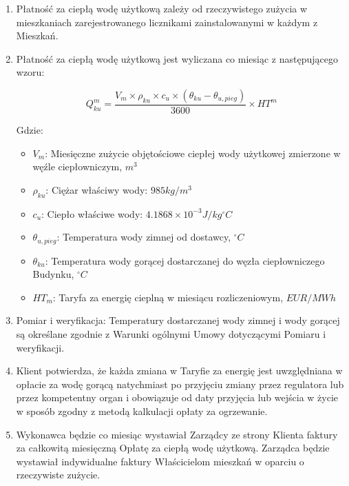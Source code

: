 \begin{enumerate}
	\item Płatność za ciepłą wodę użytkową zależy od rzeczywistego zużycia w mieszkaniach zarejestrowanego licznikami zainstalowanymi w każdym z Mieszkań.
	\item Płatność za ciepłą wodę użytkową jest wyliczana co miesiąc z następującego wzoru:

\[ Q^{m}_{ku} = \frac{V_m \times \rho_{ku} \times c_u \times \left(\theta_{ku} - \theta_{u,pieg}\right)}{3600} \times HT^m \]

Gdzie:

\begin{itemize}
	\item $V_m$: Miesięczne zużycie objętościowe ciepłej wody użytkowej zmierzone w węźle ciepłowniczym, $m^3$
	\item $\rho_{ku}$: Ciężar właściwy wody: $985 kg/m^3$
	\item $c_u$: Ciepło właściwe wody: $4.1868 \times 10^{-3} J/kg^\circ C$
	\item $\theta_{u,pieg}$: Temperatura wody zimnej od dostawcy, $^\circ C$
	\item $\theta_{ku}$: Temperatura wody gorącej dostarczanej do węzła ciepłowniczego Budynku, $^\circ C$
	\item $HT_m$: Taryfa za energię cieplną w miesiącu rozliczeniowym, $EUR/MWh$
\end{itemize}

	\item Pomiar i weryfikacja: Temperatury dostarczanej wody zimnej i wody gorącej są określane zgodnie z Warunki ogólnymi Umowy dotyczącymi Pomiaru i weryfikacji.
	\item Klient potwierdza, że każda zmiana w Taryfie za energię jest uwzględniana w opłacie za wodę gorącą natychmiast po przyjęciu zmiany przez regulatora lub przez kompetentny organ i obowiązuje od daty przyjęcia lub wejścia w życie w sposób zgodny z metodą kalkulacji opłaty za ogrzewanie.
	\item Wykonawca będzie co miesiąc wystawiał Zarządcy ze strony Klienta faktury za całkowitą miesięczną Opłatę za ciepłą wodę użytkową. Zarządca będzie wystawiał indywidualne faktury Właścicielom mieszkań w oparciu o rzeczywiste zużycie.
\end{enumerate}
